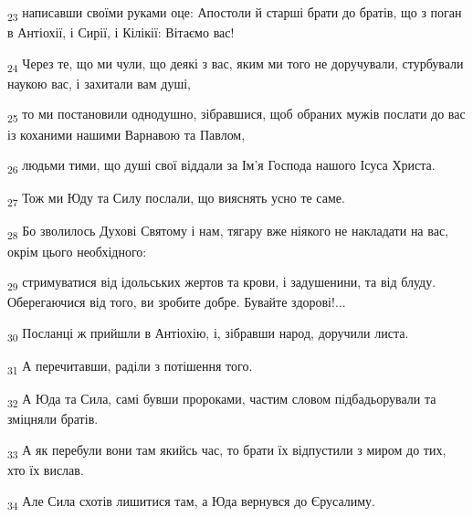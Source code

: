 \begin{tcolorbox}
\textsubscript{23} написавши своїми руками оце: Апостоли й старші брати до братів, що з поган в Антіохії, і Сирії, і Кілікії: Вітаємо вас!
\end{tcolorbox}
\begin{tcolorbox}
\textsubscript{24} Через те, що ми чули, що деякі з вас, яким ми того не доручували, стурбували наукою вас, і захитали вам душі,
\end{tcolorbox}
\begin{tcolorbox}
\textsubscript{25} то ми постановили однодушно, зібравшися, щоб обраних мужів послати до вас із коханими нашими Варнавою та Павлом,
\end{tcolorbox}
\begin{tcolorbox}
\textsubscript{26} людьми тими, що душі свої віддали за Ім'я Господа нашого Ісуса Христа.
\end{tcolorbox}
\begin{tcolorbox}
\textsubscript{27} Тож ми Юду та Силу послали, що вияснять усно те саме.
\end{tcolorbox}
\begin{tcolorbox}
\textsubscript{28} Бо зволилось Духові Святому і нам, тягару вже ніякого не накладати на вас, окрім цього необхідного:
\end{tcolorbox}
\begin{tcolorbox}
\textsubscript{29} стримуватися від ідольських жертов та крови, і задушенини, та від блуду. Оберегаючися від того, ви зробите добре. Бувайте здорові!...
\end{tcolorbox}
\begin{tcolorbox}
\textsubscript{30} Посланці ж прийшли в Антіохію, і, зібравши народ, доручили листа.
\end{tcolorbox}
\begin{tcolorbox}
\textsubscript{31} А перечитавши, раділи з потішення того.
\end{tcolorbox}
\begin{tcolorbox}
\textsubscript{32} А Юда та Сила, самі бувши пророками, частим словом підбадьорували та зміцняли братів.
\end{tcolorbox}
\begin{tcolorbox}
\textsubscript{33} А як перебули вони там якийсь час, то брати їх відпустили з миром до тих, хто їх вислав.
\end{tcolorbox}
\begin{tcolorbox}
\textsubscript{34} Але Сила схотів лишитися там, а Юда вернувся до Єрусалиму.
\end{tcolorbox}
